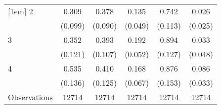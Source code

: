 {\begin{tabular}{l*{5}{c}}
[1em]
2                   &       0.309\sym{**} &       0.378\sym{***}&       0.135\sym{**} &       0.742\sym{***}&       0.026         \\
                    &     (0.099)         &     (0.090)         &     (0.049)         &     (0.113)         &     (0.025)         \\
[1em]
3                   &       0.352\sym{**} &       0.393\sym{***}&       0.192\sym{***}&       0.894\sym{***}&       0.033         \\
                    &     (0.121)         &     (0.107)         &     (0.052)         &     (0.127)         &     (0.048)         \\
[1em]
4                   &       0.535\sym{***}&       0.410\sym{**} &       0.168\sym{*}  &       0.876\sym{***}&       0.086\sym{**} \\
                    &     (0.136)         &     (0.125)         &     (0.067)         &     (0.153)         &     (0.033)         \\
\hline
Observations        &       12714         &       12714         &       12714         &       12714         &       12714         \\
\hline\hline
\end{tabular}
}

